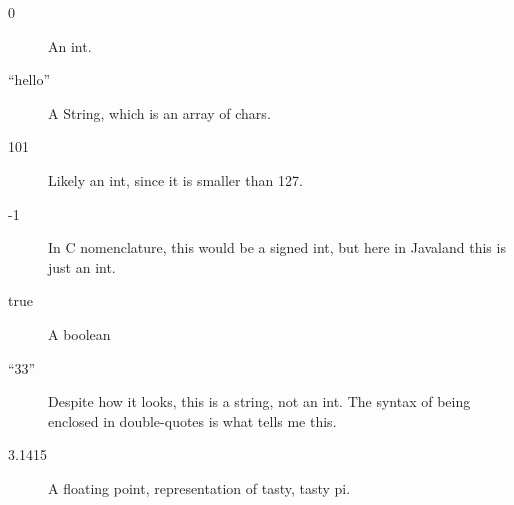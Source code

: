 \begin{description}
	\item [0] An int.
	\item [``hello''] A String, which is an array of chars.
	\item [101] Likely an int, since it is smaller than 127. 
	\item [-1] In C nomenclature, this would be a signed int, but
		here in Javaland this is just an int.
	\item [true] A boolean
	\item [``33''] Despite how it looks, this is a string, not an int.
		The syntax of being enclosed in double-quotes is what
		tells me this.
	\item [3.1415] A floating point, representation of tasty, tasty
		pi.
\end{description}
